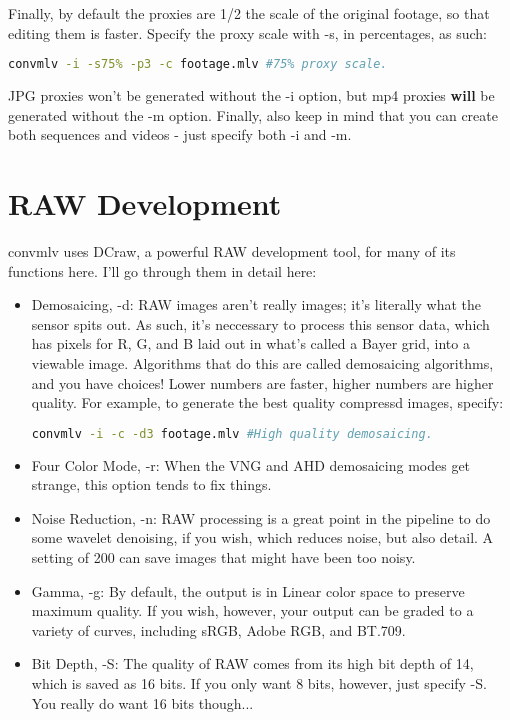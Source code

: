 \documentclass[a4paper,12pt]{article}
\begin{document}
	Finally, by default the proxies are 1/2 the scale of the original footage, so that editing them is faster.
	Specify the proxy scale with -s, in percentages, as such:
	
\begin{lstlisting}[language=bash]
	convmlv -i -s75% -p3 -c footage.mlv #75% proxy scale.
\end{lstlisting}

	JPG proxies won't be generated without the -i option, but mp4 proxies \textbf{will} be generated without the -m option. Finally,
	also keep in mind that you can create both sequences and videos - just specify both -i and -m.

\section{RAW Development}
	
	convmlv uses DCraw, a powerful RAW development tool, for many of its functions here. I'll go through them in detail here:
	
	\begin{itemize}
			\item Demosaicing, -d: RAW images aren't really images; it's literally what the sensor spits out. As such, it's neccessary to process
			this sensor data, which has pixels for R, G, and B laid out in what's called a Bayer grid, into a viewable image. Algorithms that
			do this are called demosaicing algorithms, and you have choices! Lower numbers are faster, higher numbers are higher quality.
			For example, to generate the best quality compressd images, specify:
			
\begin{lstlisting}[language=bash]
	convmlv -i -c -d3 footage.mlv #High quality demosaicing.
\end{lstlisting}

			\item Four Color Mode, -r: When the VNG and AHD demosaicing modes get strange, this option tends to fix things.
			\item Noise Reduction, -n: RAW processing is a great point in the pipeline to do some wavelet denoising, if you wish, which reduces
			noise, but also detail. A setting of 200 can save images that might have been too noisy.
			\item Gamma, -g: By default, the output is in Linear color space to preserve maximum quality. If you wish, however, your output
			can be graded to a variety of curves, including sRGB, Adobe RGB, and BT.709.
			\item Bit Depth, -S: The quality of RAW comes from its high bit depth of 14, which is saved as 16 bits. If you only want 8 bits,
			however, just specify -S. You really do want 16 bits though...
		\end{itemize}
	
\end{document}
